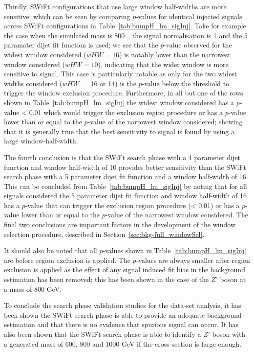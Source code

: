 Thirdly, SWiFt configurations that use large window half-widths are more sensitive;
which can be seen by comparing \bh{} $p$-values for identical injected signals across SWiFt configurations in Table~\ref{tab:bumpH_lm_sigInj}.
Take for example the case when the simulated mass is 800~\GeV{},
the signal normalisation is 1 and the 5 paramater dijet fit function is used;
we see that the $p$-value observed for the widest window considered ($wHW = 16$)
is notably lower than the narrowest window considered ($wHW = 10$),
indicating that the wider window is more sensitive to signal.
This case is particularly notable as only for the two widest widths considered
($wHW =$ 16 or 14) is the $p$-value
below the threshold to trigger the window exclusion procedure.
Furthermore, in all but one of the rows shown in Table~\ref{tab:bumpH_lm_sigInj}
the widest window considered has a $p$-value < 0.01 which would trigger the exclusion region procedure
or has a $p$-value lower than or equal to the $p$-value of the narrowest window considered;
showing that it is generally true that the best sensitivity to signal is found by using a large window-half-width. 

The fourth conclusion is that the SWiFt search phase
with a 4 parameter dijet function and window half-width of 10 provides better sensitivity
than the SWiFt search phase with a 5 parameter dijet fit function and a window half-width of 16.
This can be concluded from Table~\ref{tab:bumpH_lm_sigInj} by noting that for all signals considered
the 5 parameter dijet fit function and window half-width of 16
has a $p$-value that can trigger the exclusion region procedure (< 0.01)
or has a $p$-value lower than or equal to the $p$-value of the narrowest window considered. 
The final two conclusions are important factors in the development of the window selection procedure, described in Section~\ref{sec:bkg-full_windowSel}.

It should also be noted that all \bh{} $p$-values shown in Table~\ref{tab:bumpH_lm_sigInj} are before region exclusion is applied.
The \bh{} \mbox{$p$-value}s are always smaller after region exclusion is applied
as the effect of any signal induced fit bias in the background estimation has been removed;
this has been shown in the case of the $Z'$ boson at a mass of 800 GeV.

To conclude the search phase validation studies for the \lm{} data-set analysis,
it has been shown the SWiFt search phase is
able to provide an adequate background estimation 
and that there is no evidence that spurious signal can occur.
It has also been shown that 
the SWiFt search phase is able to identify a
$Z'$ boson with a generated mass of 600, 800 and 1000 GeV if the cross-section is large enough.

